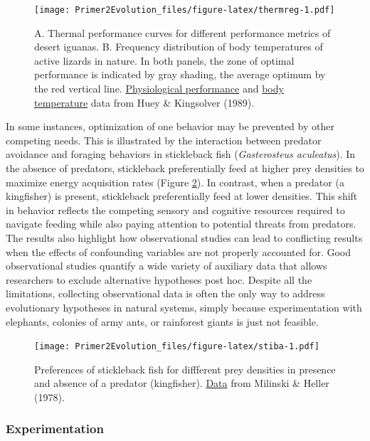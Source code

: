 \documentclass[
]{book}
\begin{document}
\begin{figure}
\centering
\texttt{[image: Primer2Evolution\_files/figure-latex/thermreg-1.pdf]}
\caption{\label{fig:thermreg}A. Thermal performance curves for different performance metrics of desert iguanas. B. Frequency distribution of body temperatures of active lizards in nature. In both panels, the zone of optimal performance is indicated by gray shading, the average optimum by the red vertical line. \href{data/9_thermoregulation1.csv}{Physiological performance} and \href{data/9_thermoregulation2.csv}{body temperature} data from Huey \& Kingsolver (1989).}
\end{figure}

In some instances, optimization of one behavior may be prevented by other competing needs. This is illustrated by the interaction between predator avoidance and foraging behaviors in stickleback fish (\emph{Gasterosteus aculeatus}). In the absence of predators, stickleback preferentially feed at higher prey densities to maximize energy acquisition rates (Figure \ref{fig:stiba}). In contrast, when a predator (a kingfisher) is present, stickleback preferentially feed at lower densities. This shift in behavior reflects the competing sensory and cognitive resources required to navigate feeding while also paying attention to potential threats from predators. The results also highlight how observational studies can lead to conflicting results when the effects of confounding variables are not properly accounted for. Good observational studies quantify a wide variety of auxiliary data that allows researchers to exclude alternative hypotheses post hoc. Despite all the limitations, collecting observational data is often the only way to address evolutionary hypotheses in natural systems, simply because experimentation with elephants, colonies of army ants, or rainforest giants is just not feasible.

\begin{figure}
\centering
\texttt{[image: Primer2Evolution\_files/figure-latex/stiba-1.pdf]}
\caption{\label{fig:stiba}Preferences of stickleback fish for diffferent prey densities in presence and absence of a predator (kingfisher). \href{data/9_stickleback.csv}{Data} from Milinski \& Heller (1978).}
\end{figure}

\hypertarget{experimentation}{%
\subsubsection*{Experimentation}\label{experimentation}}
\end{document}
